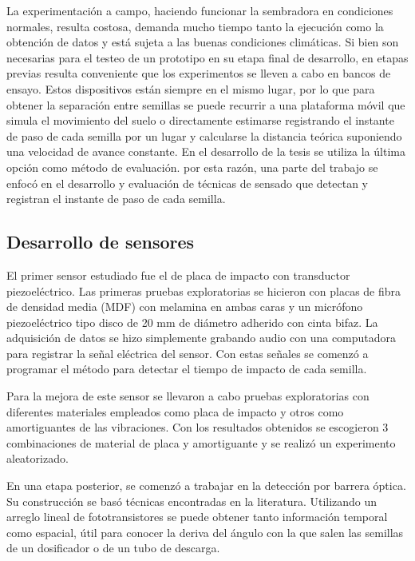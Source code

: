 \documentclass[12pt]{article}
\begin{document}
	La experimentación a campo, haciendo funcionar la sembradora en condiciones normales, resulta costosa, demanda mucho tiempo tanto la ejecución como la obtención de datos y está sujeta a las buenas condiciones climáticas. Si bien son necesarias para el testeo de un prototipo en su etapa final de desarrollo, en etapas previas resulta conveniente que los experimentos se lleven a cabo en bancos de ensayo. Estos dispositivos están siempre en el mismo lugar, por lo que para obtener la separación entre semillas se puede recurrir a una plataforma móvil que simula el movimiento del suelo o directamente estimarse registrando el instante de paso de cada semilla por un lugar y calcularse la distancia teórica suponiendo una velocidad de avance constante. En el desarrollo de la tesis se utiliza la última opción como método de evaluación.
	por esta razón, una parte del trabajo se enfocó en el desarrollo y evaluación de técnicas de sensado que detectan y registran el instante de paso de cada semilla.	
	
	\subsection{Desarrollo de sensores}
    
    El primer sensor estudiado fue el de placa de impacto con transductor piezoeléctrico. Las primeras pruebas exploratorias se hicieron con placas de fibra de densidad media (MDF) con melamina en ambas caras y un micrófono piezoeléctrico tipo disco de 20 mm de diámetro adherido con cinta bifaz. La adquisición de datos se hizo simplemente grabando audio con una computadora para registrar la señal eléctrica del sensor. Con estas señales se comenzó a programar el método para detectar el tiempo de impacto de cada semilla.
    
    Para la mejora de este sensor se llevaron a cabo pruebas exploratorias con diferentes materiales empleados como placa de impacto y otros como amortiguantes de las vibraciones. Con los resultados obtenidos se escogieron 3 combinaciones de material de placa y amortiguante y se realizó un experimento aleatorizado. 
    
    En una etapa posterior, se comenzó a trabajar en la detección por barrera óptica. Su construcción se basó técnicas encontradas en la literatura. Utilizando un arreglo lineal de fototransistores se puede obtener tanto información temporal como espacial, útil para conocer la deriva del ángulo con la que salen las semillas de un dosificador o de un tubo de descarga.
	
\end{document}
